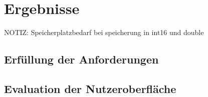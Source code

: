 \chapter{Ergebnisse}

NOTIZ: Speicherplatzbedarf bei speicherung in int16 und double

\section{Erf\"ullung der Anforderungen}

\section{Evaluation der Nutzeroberfl\"ache}

